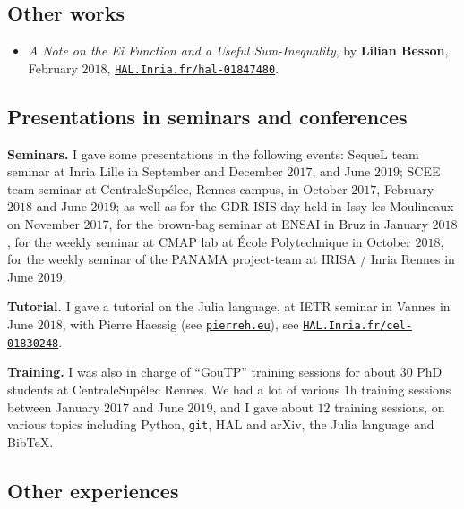 \subsection{Other works}

\begin{itemize}
\item
    \emph{A Note on the Ei Function and a Useful Sum-Inequality},
    by \textbf{Lilian Besson},
    February $2018$,
    \href{https://HAL.Inria.fr/hal-01847480}{\texttt{HAL.Inria.fr/hal-01847480}}.

\end{itemize}


\subsection{Presentations in seminars and conferences}

\textbf{Seminars.}
    I gave some presentations in the following events:
    SequeL team seminar at Inria Lille in September and December $2017$, and June $2019$;
    SCEE team seminar at CentraleSupélec, Rennes campus, in October $2017$, February $2018$ and June $2019$;
    as well as
    for the GDR ISIS day held in Issy-les-Moulineaux on November $2017$,
    for the brown-bag seminar at ENSAI in Bruz in January $2018$,
    for the weekly seminar at CMAP lab at École Polytechnique in October $2018$,
    for the weekly seminar of the PANAMA project-team at IRISA / Inria Rennes in June $2019$.

\textbf{Tutorial.}
    I gave a tutorial on the Julia language, at IETR seminar in Vannes in June $2018$,
    with Pierre Haessig (see \href{https://pierreh.eu/}{\texttt{pierreh.eu}}), see \href{https://HAL.Inria.fr/cel-01830248}{\texttt{HAL.Inria.fr/cel-01830248}}.

\textbf{Training.}
    I was also in charge of ``GouTP'' training sessions for about $30$ PhD students at CentraleSupélec Rennes.
    We had a lot of various $1$h training sessions between January $2017$ and June $2019$,
    and I gave about $12$ training sessions, on various topics including Python, \texttt{git}, HAL and arXiv, the Julia language and Bib\TeX{}.


\subsection{Other experiences}

